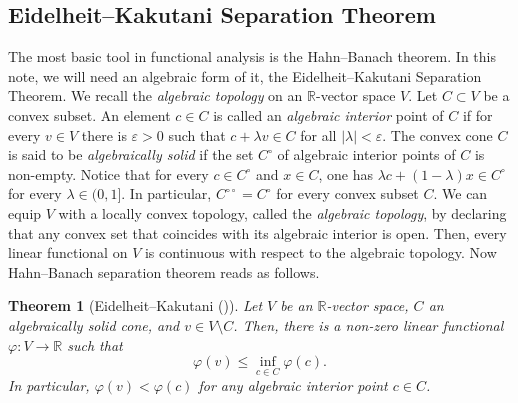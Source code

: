 \documentclass[12pt]{amsart}
\newtheorem{thm}{Theorem}
\theoremstyle{definition}
\begin{document}
\subsection{Eidelheit--Kakutani Separation Theorem}
The most basic tool in functional analysis is the Hahn--Banach theorem.
In this note, we will need an algebraic form of it, the Eidelheit--Kakutani Separation Theorem.
We recall the \emph{algebraic topology} on an ${{\mathbb R}}$-vector space $V$.
Let $C\subset V$ be a convex subset. An element $c\in C$ is called
an \emph{algebraic interior} point of $C$
if for every $v\in V$ there is ${\varepsilon}>0$ such that $c+\lambda v\in C$ for all $|\lambda|<{\varepsilon}$.
The convex cone $C$ is said to be \emph{algebraically solid} if
the set $C^\circ$ of algebraic interior points of $C$ is non-empty.
Notice that for every $c\in C^\circ$ and $x\in C$, one has
$\lambda c + (1-\lambda)x \in C^\circ$ for every $\lambda\in(0,1]$.
In particular, $C^{\circ\circ}=C^\circ$ for every convex subset $C$.
We can equip $V$ with a locally convex topology, called the \emph{algebraic topology},
by declaring that any convex set that coincides with its algebraic interior is open.
Then, every linear functional on $V$ is continuous with respect to the algebraic topology.
Now Hahn--Banach separation theorem reads as follows.
\begin{thm}[Eidelheit--Kakutani (\cite{barvinok})]\label{thm:hbek}
Let $V$ be an ${{\mathbb R}}$-vector space,
$C$ an algebraically solid cone, and $v\in V\setminus C$.
Then, there is a non-zero linear functional ${\varphi}\colon V\to{{\mathbb R}}$ such that
\[
{\varphi}(v) \le \inf_{c\in C}{\varphi}(c).
\]
In particular, ${\varphi}(v)<{\varphi}(c)$ for any algebraic interior point $c\in C$.
\end{thm}
\end{document}
